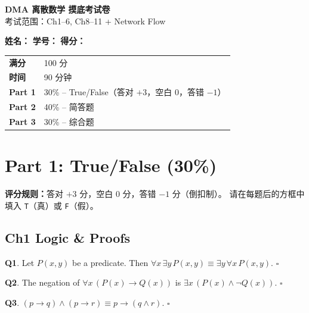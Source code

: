 \documentclass[11pt,a4paper,fontset=mac]{ctexart}
\newcommand{\tfblank}{$\square$}
\newcommand{\question}[1]{\textbf{Q#1}.}
\begin{document}
\noindent\hrulefill
\begin{center}
  {\LARGE\bfseries DMA 离散数学 摸底考试卷}\\[4pt]
  {\large 考试范围：Ch1--6, Ch8--11 + Network Flow}
\end{center}
\hrulefill

\vspace{1em}
\noindent\textbf{姓名：}\underline{\hspace{4cm}}\hfill
\textbf{学号：}\underline{\hspace{4cm}}\hfill
\textbf{得分：}\underline{\hspace{2cm}}

\vspace{1em}
\begin{tabular}{ll}
  \textbf{满分} & 100 分 \\
  \textbf{时间} & 90 分钟 \\
  \textbf{Part 1} & 30\% \;--\; True/False（答对 $+3$，空白 $0$，答错 $-1$）\\
  \textbf{Part 2} & 40\% \;--\; 简答题 \\
  \textbf{Part 3} & 30\% \;--\; 综合题
\end{tabular}

\section*{Part 1: True/False (30\%)}

\noindent\textbf{评分规则：}答对 $+3$ 分，空白 $0$ 分，答错 $-1$ 分（倒扣制）。
请在每题后的方框中填入 \texttt{T}（真）或 \texttt{F}（假）。

\subsection*{Ch1\;\; Logic \& Proofs}

\question{1}  Let $P(x,y)$ be a predicate. Then
$\forall x\,\exists y\,P(x,y) \equiv \exists y\,\forall x\,P(x,y)$.
\hfill\tfblank

\question{2}  The negation of $\forall x\,(P(x)\to Q(x))$ is
$\exists x\,(P(x)\land\neg Q(x))$.
\hfill\tfblank

\question{3}  $(p\to q)\land(p\to r)\equiv p\to(q\land r)$.
\hfill\tfblank

\end{document}
